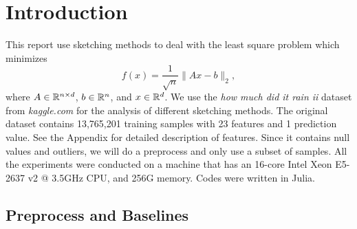 \section{Introduction}
\label{sec:intro}

This report use sketching methods to deal with the
least square problem which minimizes
\begin{equation} \label{eq:ls}
    f(x) = \frac{1}{\sqrt{n}} \|Ax-b\|_2,
\end{equation}
where $A\in{\mathbb{R}}^{n\times d}$, $b\in{\mathbb{R}}^n$, and $x\in{\mathbb{R}}^d$.
We use the \emph{how much did it rain ii} \cite{rain, Lakshmanan16}
dataset from \emph{kaggle.com} for the analysis of different sketching methods.
The original dataset contains 13,765,201 training samples
with 23 features and 1 prediction value.
See the Appendix for detailed description of features.
Since it contains null values and outliers,
we will do a preprocess and only use a subset of samples.
All the experiments were conducted on a machine
that has an 16-core Intel Xeon E5-2637 v2 @ 3.5GHz CPU,
and 256G memory.
Codes were written in Julia.

\subsection{Preprocess and Baselines}

